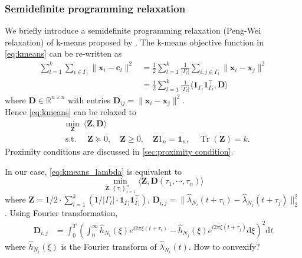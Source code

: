 		\subsubsection*{Semidefinite programming relaxation}
			We briefly introduce a semidefinite programming relaxation (Peng-Wei relaxation) of k-means proposed by \citet{Peng2005}.
			The k-means objective function in \eqref{eq:kmeans} can be re-written as
			\begin{align*}
			\sum_{l=1}^k\sum_{i\in\Gamma_l}\|\mathbf{x}_i- \mathbf{c}_l\|^2 &= \frac{1}{2}\sum_{l=1}^k \frac{1}{|\Gamma_l|}\sum_{i,j\in\Gamma_l}\|\mathbf{x}_i - \mathbf{x}_j\|^2\\
			&= \frac{1}{2}\sum_{l=1}^k\frac{1}{|\Gamma_l|}\langle \mathbf{1}_{\Gamma_l}\mathbf{1}_{\Gamma_l}^\top,\mathbf{D} \rangle
			\end{align*}
			where $\mathbf{D}\in \mathbb{R}^{n\times n}$ with entries $\mathbf{D}_{ij}=\|\mathbf{x}_i- \mathbf{x}_j\|^2$.
			\\
			Hence \eqref{eq:kmeans} can be relaxed to
			\begin{align*}
			&\min_{\mathbf{Z}}\ \langle \mathbf{Z},\mathbf{D}\rangle \qquad \\
			& \ \text{s.t. } \quad \mathbf{Z} \succeq 0, \quad \mathbf{Z} \geq 0, \quad \mathbf{Z} 1_{n}=\mathbf{1}_{n}, \quad \operatorname{Tr}(\mathbf{Z})=k.
			\end{align*}
		Proximity conditions are discussed in \ref{sec:proximity condition}.
		
		In our case, \eqref{eq:kmeans_lambda} is equivalent to 
			\begin{equation}\label{eq:unconvexified k-means}
			\min_{\mathbf{Z},\left\{ \tau_i \right\}_{i=1}^n}\langle \mathbf{Z}, \mathbf D(\tau_1,\cdots,\tau_n)  \rangle
			\end{equation}
		where $\mathbf{Z}=1/2\cdot \sum_{l=1}^k(1/|\Gamma_l|\cdot \mathbf{1}_{\Gamma_l}\mathbf{1}_{\Gamma_l}^\top)$, $\mathbf{D}_{i,j} = \| \hat\lambda_{N_i}(t+\tau_i)-\hat\lambda_{N_j}(t+\tau_j) \|_2^2$.
		Using Fourier transformation, 
		\begin{align*}
		\mathbf{D}_{i,j} &= \int_{0}^T \left( \int_0^\infty \hat h_{N_i}(\xi)e^{i2\pi\xi(t+\tau_i)}-\hat h_{N_j}(\xi)e^{i2\pi\xi(t+\tau_j)}\text{d}\xi \right)^2 \text{d}t
		\end{align*}
		where $\hat h_{N_i}(\xi)$ is the Fourier transform of $\hat\lambda_{N_i}(t)$. 
		{\color{red} How to convexify?}
		
		
		








